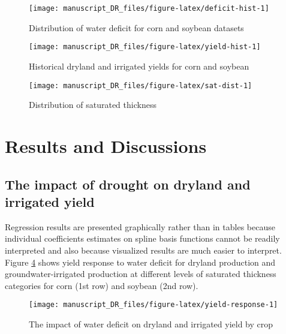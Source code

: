 \documentclass[
]{article}
\begin{document}
\begin{figure}

{\centering \texttt{[image: manuscript\_DR\_files/figure-latex/deficit-hist-1]} 

}

\caption{Distribution of water deficit for corn and soybean datasets}\label{fig:deficit-hist}
\end{figure}

\begin{figure}

{\centering \texttt{[image: manuscript\_DR\_files/figure-latex/yield-hist-1]} 

}

\caption{Historical dryland and irrigated yields for corn and soybean}\label{fig:yield-hist}
\end{figure}

\begin{figure}

{\centering \texttt{[image: manuscript\_DR\_files/figure-latex/sat-dist-1]} 

}

\caption{Distribution of saturated thickness}\label{fig:sat-dist}
\end{figure}

\hypertarget{results-and-discussions}{%
\section{Results and Discussions}\label{results-and-discussions}}

\hypertarget{the-impact-of-drought-on-dryland-and-irrigated-yield}{%
\subsection{The impact of drought on dryland and irrigated yield}\label{the-impact-of-drought-on-dryland-and-irrigated-yield}}

Regression results are presented graphically rather than in tables because individual coefficients estimates on spline basis functions cannot be readily interpreted and also because visualized results are much easier to interpret. Figure \ref{fig:yield-response} shows yield response to water deficit for dryland production and groundwater-irrigated production at different levels of saturated thickness categories for corn (1st row) and soybean (2nd row).

\begin{figure}

{\centering \texttt{[image: manuscript\_DR\_files/figure-latex/yield-response-1]} 

}

\caption{The impact of water deficit on dryland and irrigated yield by crop}\label{fig:yield-response}
\end{figure}
\end{document}

